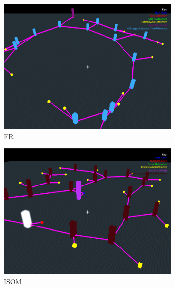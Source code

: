 \documentclass[11pt, a4paper]{report}
\begin{document}
\begin{figure}[h]
        \centering
        \begin{subfigure}[b]{0.4\textwidth}
                \centering
                \includegraphics[width=\textwidth]{images/final/frcomparison.png}
                \caption{FR}
        \end{subfigure}%
        \qquad
        \begin{subfigure}[b]{0.4\textwidth}
                \centering
                \includegraphics[width=\textwidth]{images/final/isomcomparison.png}
                \caption{ISOM}
        \end{subfigure}
        \qquad
        \begin{subfigure}[b]{0.4\textwidth}

\end{subfigure}
\end{figure}
\end{document}
